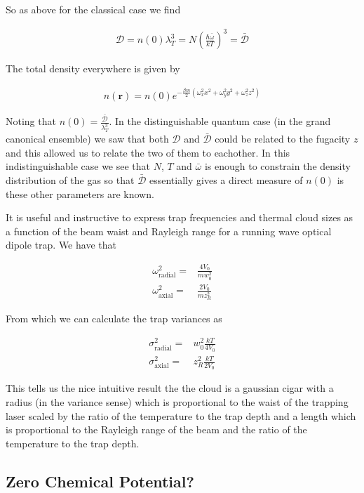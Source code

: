 \documentclass[12pt]{article}
\newcommand{\bv}[1]{\boldsymbol{#1}}
\newcommand{\mc}[1]{\mathcal{#1}}
\begin{document}
So as above for the classical case we find

\begin{align}
\mc{D} = n(0)\lambda_T^3 = N\left(\frac{\hbar \bar{\omega}}{kT}\right)^3 = \bar{\mc{D}}
\end{align}

The total density everywhere is given by

\begin{align}
n(\bv{r}) = n(0) e^{-\frac{\beta m}{2}\left(\omega_x^2 x^2 + \omega_y^2 y^2 + \omega_z^2 z^2\right)}
\end{align}

Noting that $n(0) = \frac{\mc{\bar{D}}}{\lambda_T^3}$.
In the distinguishable quantum case (in the grand canonical ensemble) we saw that both $\mc{D}$ and $\bar{\mc{D}}$ could be related to the fugacity $z$ and this allowed us to relate the two of them to eachother.
In this indistinguishable case we see that $N$, $T$ and $\bar{\omega}$ is enough to constrain the density distribution of the gas so that $\bar{\mc{D}}$ essentially gives a direct measure of $n(0)$ is these other parameters are known.

It is useful and instructive to express trap frequencies and thermal cloud sizes as a function of the beam waist and Rayleigh range for a running wave optical dipole trap.
We have that

\begin{align}
\omega^2_{\text{radial}} =& \frac{4V_0}{m w_0^2}\\
\omega^2_{\text{axial}} =& \frac{2 V_0}{mz_R^2}
\end{align}

From which we can calculate the trap variances as

\begin{align}
\sigma^2_{\text{radial}} =& w_0^2 \frac{kT}{4V_0}\\
\sigma^2_{\text{axial}} =& z_R^2 \frac{kT}{2V_0}
\end{align}

This tells us the nice intuitive result the the cloud is a gaussian cigar with a radius (in the variance sense) which is proportional to the waist of the trapping laser scaled by the ratio of the temperature to the trap depth and a length which is proportional to the Rayleigh range of the beam and the ratio of the temperature to the trap depth.

\subsection{Zero Chemical Potential?}
\end{document}
